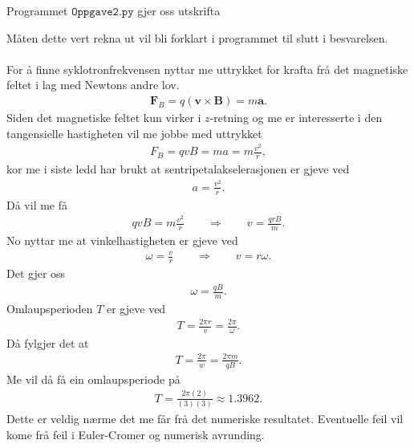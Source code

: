 \documentclass[11pt, a4paper]{article}
\begin{document}
  Programmet $\texttt{Oppgave2.py}$ gjer oss utskrifta
  \begin{center}
    
  \end{center}
  Måten dette vert rekna ut vil bli forklart i programmet til slutt i besvarelsen. \\ \\

  For å finne syklotronfrekvensen nyttar me uttrykket for krafta frå det magnetiske feltet i lag med Newtons andre lov.
  \begin{align*}
    \mathbf{F}_B = q\left( \mathbf{v} \times \mathbf{B} \right) = m\mathbf{a}.
  \end{align*}
  Siden det magnetiske feltet kun virker i $z$-retning og me er interesserte i den tangensielle hastigheten vil me jobbe med uttrykket
  \begin{align*}
    F_B = qvB = ma = m\frac{v^2}{r},
  \end{align*}
  kor me i siste ledd har brukt at sentripetalakselerasjonen er gjeve ved
  \begin{align*}
    a = \frac{v^2}{r}.
  \end{align*}
  Då vil me få
  \begin{align*}
    qvB = m\frac{v^2}{r} \qquad \Rightarrow \qquad v = \frac{qrB}{m}.
  \end{align*}
  No nyttar me at vinkelhastigheten er gjeve ved 
  \begin{align*}
    \omega = \frac{v}{r} \qquad \Rightarrow \qquad v = r\omega.
  \end{align*}
  Det gjer oss
  \begin{align*}
    \omega = \frac{qB}{m}.
  \end{align*}
  Omlaupsperioden $T$ er gjeve ved 
  \begin{align*}
    T = \frac{2\pi r}{v} = \frac{2\pi}{\omega}.
  \end{align*}
  Då fylgjer det at
  \begin{align*}
    T = \frac{2\pi}{w} = \frac{2\pi m}{qB}.
  \end{align*}
  Me vil då få ein omlaupsperiode på 
  \begin{align*}
    T = \frac{2\pi (2)}{(3)(3)} \approx 1.3962.
  \end{align*}
  Dette er veldig nærme det me får frå det numeriske resultatet. Eventuelle feil vil kome frå feil i Euler-Cromer og numerisk avrunding.
\end{document}
